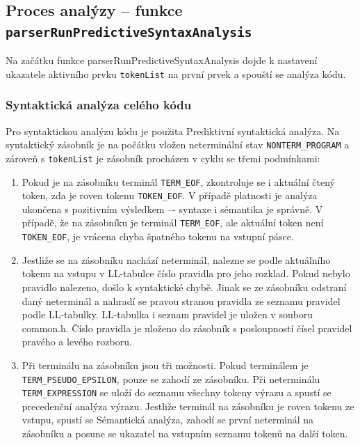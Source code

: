 \documentclass[a4paper, 12pt]{article}
\begin{document}
\subsection{Proces analýzy -- funkce \protect\Verb|parserRunPredictiveSyntaxAnalysis|}
Na začátku funkce parserRunPredictiveSyntaxAnalysis dojde k nastavení ukazatele aktivního prvku \verb|tokenList| na první prvek a spouští se analýza kódu.

\subsubsection{Syntaktická analýza celého kódu}
Pro syntaktickou analýzu kódu je použita Prediktivní syntaktická analýza. Na syntaktický zásobník je na počátku vložen neterminální stav \verb|NONTERM_PROGRAM| a zároveň s \verb|tokenList| je zásobník procházen v cyklu se třemi podmínkami:

\begin{enumerate}
    \item Pokud je na zásobníku terminál \verb|TERM_EOF|, zkontroluje se i aktuální čtený token, zda je roven tokenu \verb|TOKEN_EOF|. V případě platnosti je analýza ukončena s pozitivním výsledkem –- syntaxe i sémantika je správně. V případě, že na zásobníku je terminál \verb|TERM_EOF|, ale aktuální token není \verb|TOKEN_EOF|, je vrácena chyba špatného tokenu na vstupní pásce.
    \newpage
    \item Jestliže se na zásobníku nachází neterminál, nalezne se podle aktuálního tokenu na vstupu
    v LL-tabulce číslo pravidla pro jeho rozklad. Pokud nebylo pravidlo nalezeno, došlo k syntaktické chybě. Jinak se ze zásobníku odstraní daný neterminál a nahradí se pravou stranou pravidla ze seznamu pravidel podle LL-tabulky. LL-tabulka i seznam pravidel je uložen v souboru common.h. Číslo pravidla je uloženo do zásobník s posloupností čísel pravidel pravého a levého rozboru.
    \item Při terminálu na zásobníku jsou tři možnosti. Pokud terminálem je \verb|TERM_PSEUDO_EPSILON|, pouze se zahodí ze zásobníku. Při neterminálu \verb|TERM_EXPRESSION| se uloží do seznamu všechny tokeny výrazu a spustí se precedenční analýza výrazu. Jestliže terminál na zásobníku je roven tokenu ze vstupu, spustí se Sémantická analýza, zahodí se první neterminál na zásobníku a posune se ukazatel na vstupním seznamu tokenů na další token.
\end{enumerate}
\end{document}

